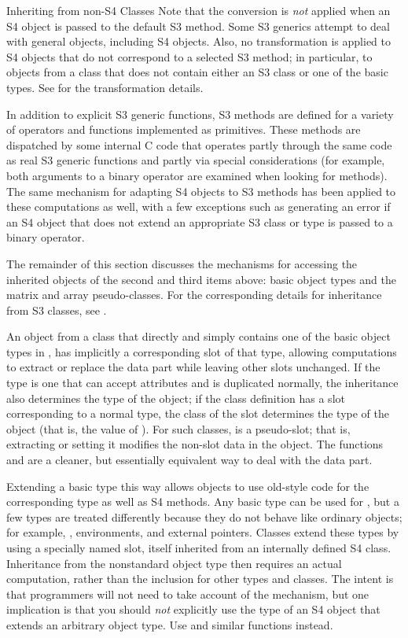 \begin{Section}{Inheriting from non-S4 Classes}
Note that the conversion is \emph{not} applied when an S4 object is passed
to the default S3 method.  Some S3 generics attempt
to deal with general objects, including S4 objects.  Also, no transformation is
applied to S4 objects that do not correspond to a
selected S3 method; in particular, to objects from a class that
does not contain either an S3 class or one of the basic types.
See  for the transformation details.

In addition to explicit S3 generic functions, S3 methods are
defined for a variety of operators and functions implemented as
primitives.  These methods are dispatched by some internal C
code that operates partly through the same code as real S3
generic functions and partly via special considerations (for
example, both arguments to a binary operator are examined when
looking for methods).  The same mechanism for adapting S4
objects to S3 methods has been applied to these computations as
well, with a few exceptions such as generating an error if an S4
object that does not extend an appropriate S3 class or type is
passed to a binary operator.

The remainder of this section discusses the mechanisms for
accessing the inherited objects of the second and third items
above:  basic object types and the matrix and array
pseudo-classes.  For the corresponding details for inheritance
from S3 classes, see .

An object from a class that directly and simply contains one
of the basic object types in \R{}, has implicitly a corresponding
 slot of that type, allowing computations to extract
or replace the data part while leaving other slots
unchanged. If the type is one that can accept attributes and is
duplicated normally, the inheritance also determines the type of the
object; if the class definition has a  slot
corresponding to a normal type, the class of the
slot determines the type of the object (that is, the value of
).
For such classes,   is a pseudo-slot; that 
is, extracting or setting it modifies the non-slot data in the
object.  The functions  and
 are a cleaner, but essentially
equivalent way to deal with the data part.

Extending a basic type this way allows objects to
use old-style code for the corresponding type as well as S4
methods.  Any basic type can be used for , but 
a few types are treated differently because they do not behave like ordinary objects;
for example, , environments, and external pointers.
Classes extend these types by using a specially named slot,
itself inherited from an internally defined S4 class.
Inheritance from the nonstandard object type then requires an
actual computation, rather than the  inclusion
for other types and classes.  The intent is that programmers
will not need to take account of the mechanism, but one
implication is that you should \emph{not} explicitly use the
type of an S4 object that extends an arbitrary object type.  Use
 and similar functions instead.


\end{Section}
